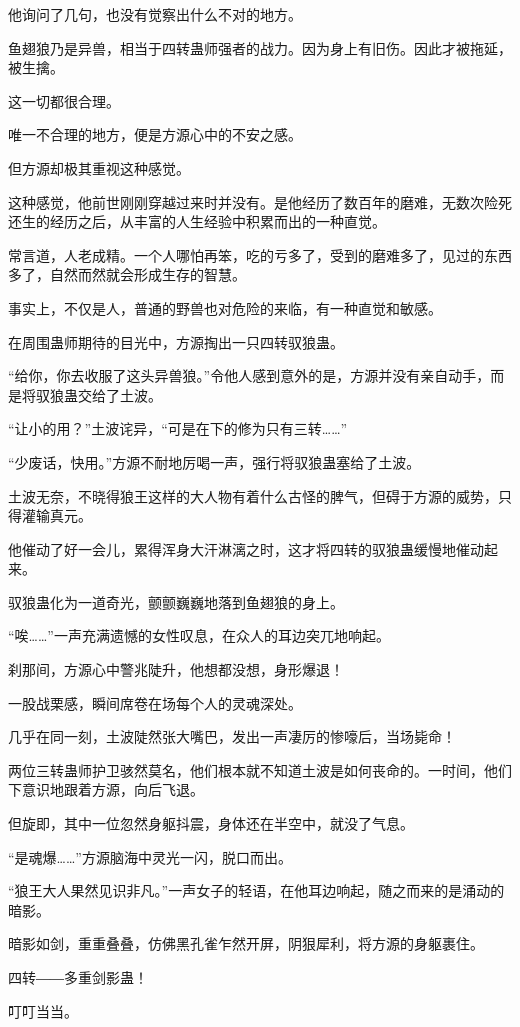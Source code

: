 \begin{this_body}
他询问了几句，也没有觉察出什么不对的地方。

鱼翅狼乃是异兽，相当于四转蛊师强者的战力。因为身上有旧伤。因此才被拖延，被生擒。

这一切都很合理。

唯一不合理的地方，便是方源心中的不安之感。

但方源却极其重视这种感觉。

这种感觉，他前世刚刚穿越过来时并没有。是他经历了数百年的磨难，无数次险死还生的经历之后，从丰富的人生经验中积累而出的一种直觉。

常言道，人老成精。一个人哪怕再笨，吃的亏多了，受到的磨难多了，见过的东西多了，自然而然就会形成生存的智慧。

事实上，不仅是人，普通的野兽也对危险的来临，有一种直觉和敏感。

在周围蛊师期待的目光中，方源掏出一只四转驭狼蛊。

“给你，你去收服了这头异兽狼。”令他人感到意外的是，方源并没有亲自动手，而是将驭狼蛊交给了土波。

“让小的用？”土波诧异，“可是在下的修为只有三转……”

“少废话，快用。”方源不耐地厉喝一声，强行将驭狼蛊塞给了土波。

土波无奈，不晓得狼王这样的大人物有着什么古怪的脾气，但碍于方源的威势，只得灌输真元。

他催动了好一会儿，累得浑身大汗淋漓之时，这才将四转的驭狼蛊缓慢地催动起来。

驭狼蛊化为一道奇光，颤颤巍巍地落到鱼翅狼的身上。

“唉……”一声充满遗憾的女性叹息，在众人的耳边突兀地响起。

刹那间，方源心中警兆陡升，他想都没想，身形爆退！

一股战栗感，瞬间席卷在场每个人的灵魂深处。

几乎在同一刻，土波陡然张大嘴巴，发出一声凄厉的惨嚎后，当场毙命！

两位三转蛊师护卫骇然莫名，他们根本就不知道土波是如何丧命的。一时间，他们下意识地跟着方源，向后飞退。

但旋即，其中一位忽然身躯抖震，身体还在半空中，就没了气息。

“是魂爆……”方源脑海中灵光一闪，脱口而出。

“狼王大人果然见识非凡。”一声女子的轻语，在他耳边响起，随之而来的是涌动的暗影。

暗影如剑，重重叠叠，仿佛黑孔雀乍然开屏，阴狠犀利，将方源的身躯裹住。

四转――多重剑影蛊！

叮叮当当。


\end{this_body}
